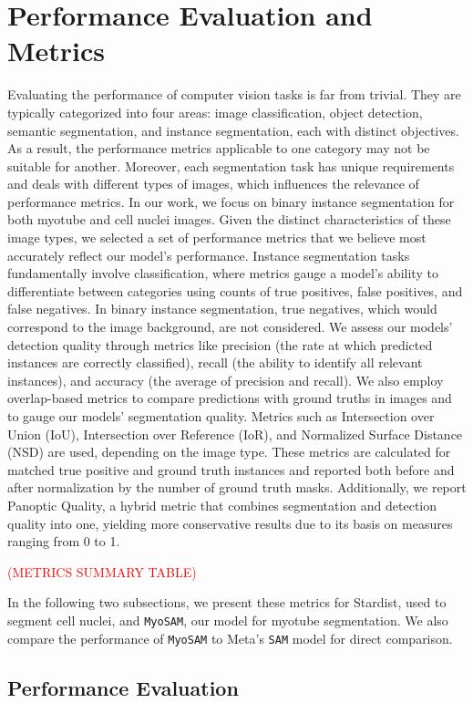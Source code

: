 \section{Performance Evaluation and Metrics}
Evaluating the performance of computer vision tasks is far from trivial. They are typically categorized into four areas: image classification, object detection, semantic segmentation, and instance segmentation, each with distinct objectives. As a result, the performance metrics applicable to one category may not be suitable for another. Moreover, each segmentation task has unique requirements and deals with different types of images, which influences the relevance of performance metrics. In our work, we focus on binary instance segmentation for both myotube and cell nuclei images. Given the distinct characteristics of these image types, we selected a set of performance metrics that we believe most accurately reflect our model's performance.
Instance segmentation tasks fundamentally involve classification, where metrics gauge a model's ability to differentiate between categories using counts of true positives, false positives, and false negatives. In binary instance segmentation, true negatives, which would correspond to the image background, are not considered. We assess our models' detection quality through metrics like precision (the rate at which predicted instances are correctly classified), recall (the ability to identify all relevant instances), and accuracy (the average of precision and recall). We also employ overlap-based metrics to compare predictions with ground truths in images and to gauge our models' segmentation quality. Metrics such as Intersection over Union (IoU), Intersection over Reference (IoR), and Normalized Surface Distance (NSD) are used, depending on the image type. These metrics are calculated for matched true positive and ground truth instances and reported both before and after normalization by the number of ground truth masks. Additionally, we report Panoptic Quality, a hybrid metric that combines segmentation and detection quality into one, yielding more conservative results due to its basis on measures ranging from 0 to 1.

\textcolor{red}{(METRICS SUMMARY TABLE)}

In the following two subsections, we present these metrics for Stardist, used to segment cell nuclei, and \texttt{MyoSAM}, our model for myotube segmentation. We also compare the performance of \texttt{MyoSAM} to Meta’s \texttt{SAM} model for direct comparison.
\subsection{Performance Evaluation}
